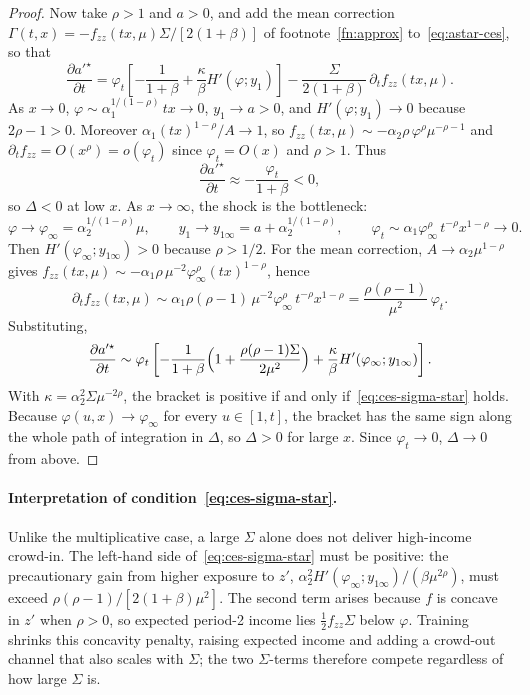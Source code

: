 \documentclass[12pt]{article}
\begin{document}
\begin{proof}
    Now take $\rho>1$ and $a>0$, and add the mean correction $\Gamma(t,x)=-f_{zz}(tx,\mu)\Sigma/[2(1+\beta)]$ of footnote~\ref{fn:approx} to~\eqref{eq:astar-ces}, so that
    \[
        \frac{\partial a'^{\star}}{\partial t}
        =
        \varphi_t\left[-\frac{1}{1+\beta}+\frac{\kappa}{\beta}H'(\varphi;y_1)\right]
        -\frac{\Sigma}{2(1+\beta)}\,\partial_t f_{zz}(tx,\mu).
    \]
    As $x\to 0$, $\varphi\sim\alpha_1^{1/(1-\rho)}\,tx\to 0$, $y_1\to a>0$, and $H'(\varphi;y_1)\to 0$ because $2\rho-1>0$. Moreover $\alpha_1(tx)^{1-\rho}/A\to 1$, so $f_{zz}(tx,\mu)\sim-\alpha_2\rho\,\varphi^{\rho}\mu^{-\rho-1}$ and $\partial_t f_{zz}=O(x^{\rho})=o(\varphi_t)$ since $\varphi_t=O(x)$ and $\rho>1$. Thus
    \[
        \frac{\partial a'^{\star}}{\partial t}\approx -\frac{\varphi_t}{1+\beta}<0,
    \]
    so $\Delta<0$ at low $x$. As $x\to\infty$, the shock is the bottleneck:
    \[
        \varphi\to\varphi_{\infty}=\alpha_2^{1/(1-\rho)}\mu,
        \qquad
        y_1\to y_{1\infty}=a+\alpha_2^{1/(1-\rho)},
        \qquad
        \varphi_t\sim\alpha_1\varphi_{\infty}^{\rho}\,t^{-\rho}x^{1-\rho}\to 0.
    \]
    Then $H'(\varphi_{\infty};y_{1\infty})>0$ because $\rho>1/2$. For the mean correction, $A\to\alpha_2\mu^{1-\rho}$ gives $f_{zz}(tx,\mu)\sim-\alpha_1\rho\,\mu^{-2}\varphi_{\infty}^{\rho}(tx)^{1-\rho}$, hence
    \[
        \partial_t f_{zz}(tx,\mu)\sim\alpha_1\rho(\rho-1)\,\mu^{-2}\varphi_{\infty}^{\rho}\,t^{-\rho}x^{1-\rho}
        =\frac{\rho(\rho-1)}{\mu^{2}}\,\varphi_t .
    \]
    Substituting,
    \[
        \frac{\partial a'^{\star}}{\partial t}
        \sim
        \varphi_t\left[-\frac{1}{1+\beta}\Bigl(1+\frac{\rho(\rho-1)\Sigma}{2\mu^{2}}\Bigr)+\frac{\kappa}{\beta}H'(\varphi_{\infty};y_{1\infty})\right].
    \]
    With $\kappa=\alpha_2^2\Sigma\mu^{-2\rho}$, the bracket is positive if and only if~\eqref{eq:ces-sigma-star} holds. Because $\varphi(u,x)\to\varphi_{\infty}$ for every $u\in[1,t]$, the bracket has the same sign along the whole path of integration in $\Delta$, so $\Delta>0$ for large $x$. Since $\varphi_t\to 0$, $\Delta\to 0$ from above.
\end{proof}

\paragraph{Interpretation of condition~\eqref{eq:ces-sigma-star}.}
Unlike the multiplicative case, a large $\Sigma$ alone does not deliver high-income crowd-in. The left-hand side of~\eqref{eq:ces-sigma-star} must be positive: the precautionary gain from higher exposure to $z'$, $\alpha_2^2 H'(\varphi_\infty;y_{1\infty})/(\beta\mu^{2\rho})$, must exceed $\rho(\rho-1)/[2(1+\beta)\mu^{2}]$. The second term arises because $f$ is concave in $z'$ when $\rho>0$, so expected period-2 income lies $\tfrac12 f_{zz}\Sigma$ below $\varphi$. Training shrinks this concavity penalty, raising expected income and adding a crowd-out channel that also scales with $\Sigma$; the two $\Sigma$-terms therefore compete regardless of how large $\Sigma$ is.
\end{document}
